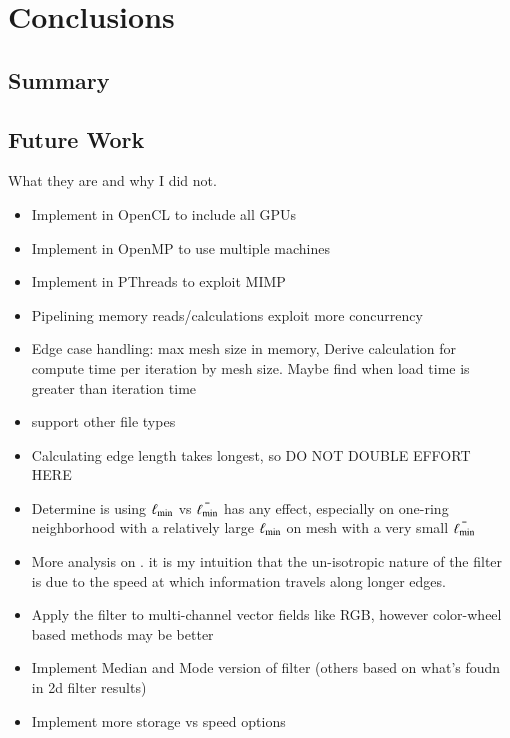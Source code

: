 \chapter{Conclusions}
%
\section{Summary}
%
\section{Future Work}
What they are and why I did not.
\begin{itemize}
	\item Implement in OpenCL to include all GPUs
	\item Implement in OpenMP to use multiple machines
	\item Implement in PThreads to exploit MIMP
	\item Pipelining memory reads/calculations exploit more concurrency
	\item Edge case handling: max mesh size in memory, Derive calculation for compute time per iteration by mesh size. Maybe find when load time is greater than iteration time
	\item support other file types
	\item Calculating edge length takes longest, so DO NOT DOUBLE EFFORT HERE
	\item Determine is using $\ell_\text{min}$ vs $\bar{\ell_\text{min}}$ has any effect, especially on one-ring neighborhood with a relatively large $\ell_\text{min}$ on mesh with a very small $\bar{\ell_\text{min}}$
	\item More analysis on \fors. it is my intuition that the un-isotropic nature of the filter is due to the speed at which information travels along longer edges.
	\item Apply the filter to multi-channel vector fields like RGB, however color-wheel based methods may be better
	\item Implement Median and Mode version of filter (others based on what's foudn in 2d filter results)
	\item Implement more storage vs speed options
\end{itemize}

